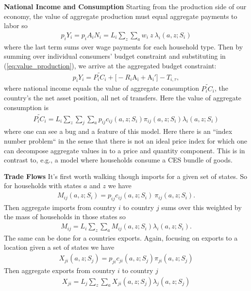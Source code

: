 \documentclass[12pt,pdftex]{article}
\begin{document}
\begin{onehalfspacing}
\textbf{National Income and Consumption} Starting from the production side of our economy, the value of aggregate production must equal aggregate payments to labor so
\begin{align}
p_{i} Y_{i} = p_{i} A_{i} N_{i} = L_i \sum_{z} \sum_{a} w_{i} \ z \ \lambda_i(a, z; S_i)
\label{eq:value_production}
\end{align}
where the last term sums over wage payments for each household type. Then by summing over individual consumers' budget constraint and substituting in (\ref{eq:value_production}), we arrive at the aggregated budget constraint:
\begin{align}
p_{i} Y_{i}  = \widetilde{P_{i} C_i}  + \bigg[-R_i\mathrm{A_i} +  \mathrm{A_i'} \bigg] - T_{i,\tau},
\label{eq:aggregate_budget_constraint}
\end{align}
where national income equals the value of aggregate consumption $\widetilde{P_{i} C_i}$, the country's the net asset position, all net of transfers. Here the value of aggregate consumption is
\begin{align}
\widetilde{P_{i} C_i} = L_{i} \sum_{z}\sum_{j}\sum_{a}  p_{ij} c_{ij}(a, z; S_i) \pi_{ij}(a, z; S_i) \lambda_i(a, z; S_i)
\end{align}
where one can see a bug and a feature of this model. Here there is an ``index number problem`` in the sense that there is not an ideal price index for which one can decompose aggregate values in to a price and quantity component. This is in contrast to, e.g., a model where households consume a CES bundle of goods.

\textbf{Trade Flows} It's first worth walking though imports for a given set of states. So for households with states $a$ and $z$ we have
\begin{align}
M_{ij}(a, z; S_i) = p_{ij} c_{ij}(a, z; S_i) \ \pi_{ij}(a, z; S_i).
\end{align}
Then aggregate imports from country $i$ to country $j$ sums over this weighted by the mass of households in those states so
\begin{align}
M_{ij} = L_i \sum_{z}\sum_{a} M_{ij}(a, z; S_i) \lambda_i(a, z; S_i).
\label{eq:imports}
\end{align}
The same can be done for a countries exports. Again, focusing on exports to a location given a set of states we have
\begin{align}
X_{ji}(a, z; S_j) = p_{ji} c_{ji}(a, z; S_j) \pi_{ji}(a, z; S_j)
\end{align}
Then aggregate exports from country $i$ to country $j$
\begin{align}
X_{ji} = L_j \sum_{z}\sum_{a} X_{ji}(a, z; S_j) \lambda_j(a, z; S_j)
\label{eq:exports}
\end{align}


\end{onehalfspacing}
\end{document}
